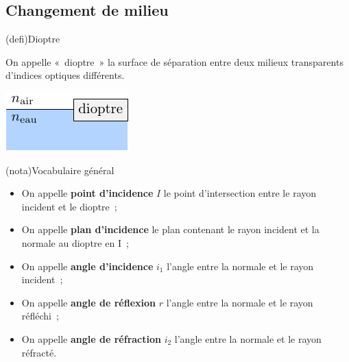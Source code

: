 \documentclass[../../main/main.tex]{subfiles}
\begin{document}
\subsection{Changement de milieu}

\begin{tcbraster}[raster columns=2, raster equal height=rows]
	\begin{tcolorbox}[blankest, raster multicolumn=1, space to=\myspace]
		\begin{tcbraster}[raster columns=1]
			\begin{tcb}[%
					label=def:dioptre,
					add to natural height=\myspace,
					valign=center](defi){Dioptre}

				On appelle «~dioptre~» la surface de séparation entre deux
				milieux transparents d'indices optiques différents.

				\tcblower
				\vfill
				\begin{center}
					\includegraphics[width=.8\linewidth]{dioptre.pdf}
					\label{fig:dioptre}
				\end{center}
			\end{tcb}
			\begin{tcb}[label=nota:descartes](nota){Vocabulaire général}
				\begin{itemize}

					\item On appelle \textbf{point d'incidence} $I$ le point
					      d'intersection entre le rayon incident et le dioptre~;
					\item On appelle \textbf{plan d'incidence} le plan contenant
					      le rayon incident et la normale au dioptre en I~;
					\item On appelle \textbf{angle d'incidence} $i_1$ l'angle
					      entre la normale et le rayon incident~;
					\item On appelle \textbf{angle de réflexion} $r$ l'angle
					      entre la normale et le rayon réfléchi~;
					\item On appelle \textbf{angle de réfraction} $i_2$ l'angle
					      entre la normale et le rayon réfracté.


\end{itemize}
\end{tcb}
\end{tcbraster}
\end{tcolorbox}
\end{tcbraster}
\end{document}
